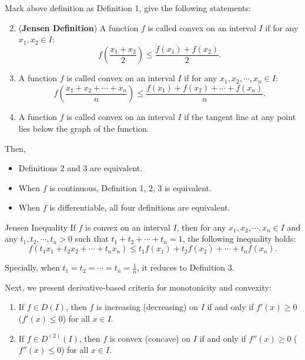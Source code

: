 \documentclass[11pt]{../../TexTemplate/elegantbook}
\begin{document}
\begin{theorem}
    Mark above definition as Definition 1, give the following statements:
    \begin{enumerate}
        \setcounter{enumi}{1} %
        \item (\textbf{Jensen Definition}) A function \(f\) is called convex on an interval \(I\) 
            if for any \(x_1, x_2 \in I\):
            \[
                f\left( \frac{x_1 + x_2}{2} \right) \leqslant \frac{f(x_1) + f(x_2)}{2}.
            \]
        \item A function \(f\) is called convex on an interval \(I\) 
            if for any \(x_1, x_2, \cdots, x_n \in I\):
            \[
                f\left( \frac{x_1 + x_2 + \cdots + x_n}{n} \right) \leqslant \frac{f(x_1) + f(x_2) + \cdots + f(x_n)}{n}.
            \]
        \item A function \(f\) is called convex on an interval \(I\) 
            if the tangent line at any point lies below the graph of the function.
    \end{enumerate}
    Then,
    \begin{itemize}
        \item Definitions 2 and 3 are equivalent. 
        \item When \(f\) is continuous, Definition 1, 2, 3 is equivalent.
        \item When \(f\) is differentiable, all four definitions are equivalent.
    \end{itemize}
\end{theorem}


\begin{theorem}{Jensen Inequality}
    If \(f\) is convex on an interval \(I\), 
    then for any \(x_1, x_2, \cdots, x_n \in I\) and any \(t_1, t_2, \cdots, t_n > 0\) 
    such that \(t_1 + t_2 + \cdots + t_n = 1\),
    the following inequality holds:
    \[
        f(t_1 x_1 + t_2 x_2 + \cdots + t_n x_n) \leqslant t_1 f(x_1) + t_2 f(x_2) + \cdots + t_n f(x_n).
    \]

    Specially, when \(t_1 = t_2 = \cdots = t_n = \frac{1}{n}\), it reduces to Definition 3.
\end{theorem}

\vspace{0.7cm}
Next, we present derivative-based criteria for monotonicity and convexity:
\begin{theorem}
    \begin{enumerate}
        \item If \(f \in D(I)\), then \(f\) is increasing (decreasing) on \(I\) 
            if and only if \(f'(x) \geq 0\) (\(f'(x) \leqslant 0\)) for all \(x \in I\). 
        \item If \(f \in D^{(2)}(I)\), then \(f\) is convex (concave) on \(I\) 
            if and only if \(f''(x) \geq 0\) (\(f''(x) \leqslant 0\)) for all \(x \in I\).
    \end{enumerate}
\end{theorem}
\end{document}
